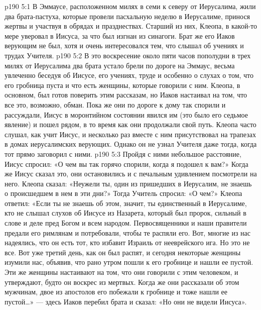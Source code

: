 \vs p190 5:1 В Эммаусе, расположенном милях в семи к северу от Иерусалима, жили два брата\hyp{}пастуха, которые провели пасхальную неделю в Иерусалиме, принося жертвы и участвуя в обрядах и празднествах. Старший из них, Клеопа, в какой\hyp{}то мере уверовал в Иисуса, за что был изгнан из синагоги. Брат же его Иаков верующим не был, хотя и очень интересовался тем, что слышал об учениях и трудах Учителя.
\vs p190 5:2 В это воскресение около пяти часов пополудни в трех милях от Иерусалима два брата устало брели по дороге на Эммаус, весьма увлеченно беседуя об Иисусе, его учениях, труде и особенно о слухах о том, что его гробница пуста и что есть женщины, которые говорили с ним. Клеопа, в основном, был готов поверить этим рассказам, но Иаков настаивал на том, что все это, возможно, обман. Пока же они по дороге к дому так спорили и рассуждали, Иисус в моронтийном состоянии явился им (это было его седьмое явление) и пошел рядом, в то время как они продолжали свой путь. Клеопа часто слушал, как учит Иисус, и несколько раз вместе с ним присутствовал на трапезах в домах иерусалимских верующих. Однако он не узнал Учителя даже тогда, когда тот прямо заговорил с ними.
\vs p190 5:3 Пройдя с ними небольшое расстояние, Иисус спросил: «О чем вы так горячо спорили, когда я подошел к вам?» Когда же Иисус сказал это, они остановились и с печальным удивлением посмотрели на него. Клеопа сказал: «Неужели ты, один из пришедших в Иерусалим, не знаешь о происшедшем в нем в эти дни?» Тогда Учитель спросил: «О чем?» Клеопа ответил: «Если ты не знаешь об этом, значит, ты единственный в Иерусалиме, кто не слышал слухов об Иисусе из Назарета, который был пророк, сильный в слове и деле пред Богом и всем народом. Первосвященники и наши правители предали его римлянам и потребовали, чтобы те распяли его. Вот, многие из нас надеялись, что он есть тот, кто избавит Израиль от нееврейского ига. Но это не все. Вот уже третий день, как он был распят, и сегодня некоторые женщины изумили нас, объявив, что рано утром пошли к его гробнице и нашли ее пустой. Эти же женщины настаивают на том, что они говорили с этим человеком, и утверждают, будто он воскрес из мертвых. Когда же они рассказали об этом мужчинам, двое из апостолов его побежали к гробнице и тоже нашли ее пустой\ldots » --- здесь Иаков перебил брата и сказал: «Но они не видели Иисуса».
